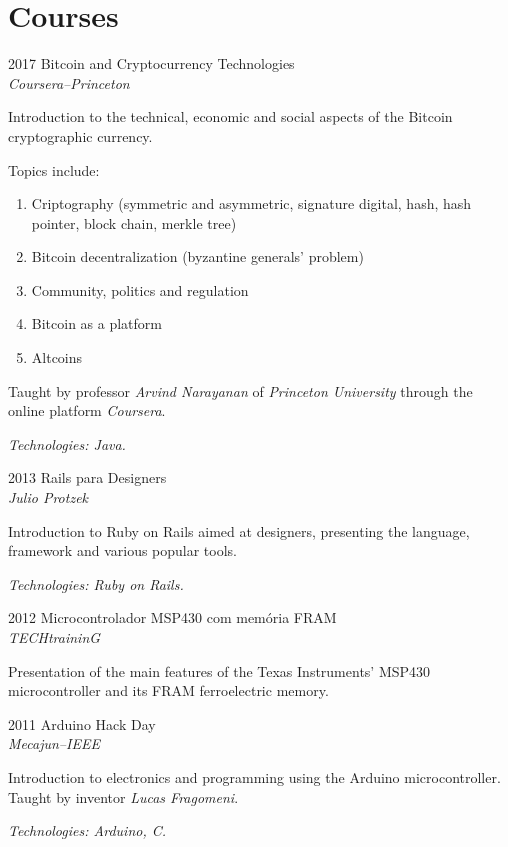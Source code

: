 \documentclass[a4paper]{simplecv}
\begin{document}
\section{Courses}

\begin{topic}
\item[2017] Bitcoin and Cryptocurrency Technologies\\
	{\em\small Coursera--Princeton}

	Introduction to the technical, economic and social aspects of the
	Bitcoin cryptographic currency.

	Topics include:
	\begin{enumerate}
		\item Criptography (symmetric and asymmetric, signature
			digital, hash, hash pointer, block chain, merkle tree)
		\item Bitcoin decentralization (byzantine generals' problem)
		\item Community, politics and regulation
		\item Bitcoin as a platform
		\item Altcoins
	\end{enumerate}

	Taught by professor \emph{Arvind Narayanan} of \emph{Princeton
	University} through the online platform \emph{Coursera}.

	{\em\scriptsize Technologies: Java.}

\item[2013] Rails para Designers\\
	{\em\small Julio Protzek}

	Introduction to Ruby on Rails aimed at designers, presenting the
	language, framework and various popular tools.

	{\em\scriptsize Technologies: Ruby on Rails.}

\item[2012] Microcontrolador MSP430 com memória FRAM\\
	{\em\small TECHtraininG}

	Presentation of the main features of the Texas Instruments' MSP430
	microcontroller and its FRAM ferroelectric memory.

\item[2011] Arduino Hack Day\\
	{\em\small Mecajun--IEEE}

	Introduction to electronics and programming using the Arduino
	microcontroller. Taught by inventor \emph{Lucas Fragomeni}.

	{\em\scriptsize Technologies: Arduino, C.}

\end{topic}
\end{document}
